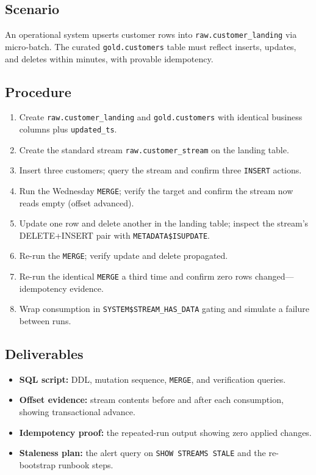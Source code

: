 \subsection*{Scenario}
An operational system upserts customer rows into \texttt{raw.customer\_landing} via micro-batch. The curated \texttt{gold.customers} table must reflect inserts, updates, and deletes within minutes, with provable idempotency.

\subsection*{Procedure}
\begin{enumerate}
    \item Create \texttt{raw.customer\_landing} and \texttt{gold.customers} with identical business columns plus \texttt{updated\_ts}.
    \item Create the standard stream \texttt{raw.customer\_stream} on the landing table.
    \item Insert three customers; query the stream and confirm three \texttt{INSERT} actions.
    \item Run the Wednesday \texttt{MERGE}; verify the target and confirm the stream now reads empty (offset advanced).
    \item Update one row and delete another in the landing table; inspect the stream's DELETE+INSERT pair with \texttt{METADATA\$ISUPDATE}.
    \item Re-run the \texttt{MERGE}; verify update and delete propagated.
    \item Re-run the identical \texttt{MERGE} a third time and confirm zero rows changed---idempotency evidence.
    \item Wrap consumption in \texttt{SYSTEM\$STREAM\_HAS\_DATA} gating and simulate a failure between runs.
\end{enumerate}

\subsection*{Deliverables}
\begin{itemize}
    \item \textbf{SQL script:} DDL, mutation sequence, \texttt{MERGE}, and verification queries.
    \item \textbf{Offset evidence:} stream contents before and after each consumption, showing transactional advance.
    \item \textbf{Idempotency proof:} the repeated-run output showing zero applied changes.
    \item \textbf{Staleness plan:} the alert query on \texttt{SHOW STREAMS STALE} and the re-bootstrap runbook steps.
\end{itemize}

